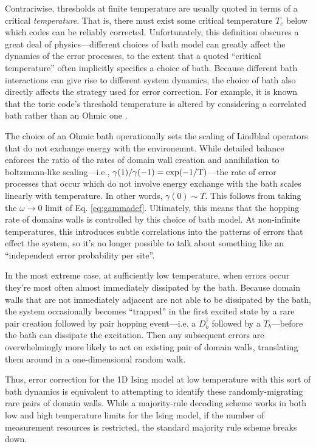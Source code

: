 \documentclass[twocolumn,superscriptaddress,aps,prb,floatfix]{revtex4-1}
\begin{document}
 Contrariwise, thresholds at finite temperature are usually quoted in terms of a critical \emph{temperature}.  That is, there must exist some critical temperature $T_c$ below which codes can be reliably corrected.  Unfortunately, this definition obscures a great deal of physics---different choices of bath model can greatly affect the dynamics of the error processes, to the extent that a quoted ``critical temperature'' often implicitly specifies a choice of bath.  Because different bath interactions can give rise to different system dynamics, the choice of bath also directly affects the strategy used for error correction.  For example, it is known that the toric code's threshold temperature is altered by considering a correlated bath rather than an Ohmic one \cite{Novais13}.
 
 The choice of an Ohmic bath operationally sets the scaling of Lindblad operators that do not exchange energy with the environemnt.  While detailed balance enforces the ratio of the rates of domain wall creation and annihilation to boltzmann-like scaling---i.e., $\gamma(1)/\gamma(-1) = \rm{exp}(-1/T)$---the rate of error processes that occur which do not involve energy exchange with the bath scales linearly with temperature.  In other words, $\gamma(0) \sim T$.  This follows from taking the $\omega\rightarrow0$ limit of  Eq. \ref{eq:gammadef}.  Ultimately, this means that the hopping rate of domains walls is controlled by this choice of bath model.  At non-infinite temperatures, this introduces subtle correlations into the patterns of errors that effect the system, so it's no longer possible to talk about something like an ``independent error probability per site''.  
 
 In the most extreme case, at sufficiently low temperature, when errors occur they're most often almost immediately dissipated by the bath.  Because domain walls that are not immediately adjacent are not able to be dissipated by the bath, the system occasionally becomes ``trapped'' in the first excited state by a rare pair creation followed by pair hopping event---i.e. a $D^\dagger_{b}$ followed by a $T_{b}$---before the bath can dissipate the excitation.  Then any subsequent errors are overwhelmingly more likely to act on existing pair of domain walls, translating them around in a one-dimensional random walk.
 
 Thus, error correction for the 1D Ising model at low temperature with this sort of bath dynamics is equivalent to attempting to identify these randomly-migrating rare pairs of domain walls.  While a majority-rule decoding scheme works in both low and high temperature limits for the Ising model, if the number of measurement resources is restricted, the standard majority rule scheme breaks down.  
 
\end{document}
